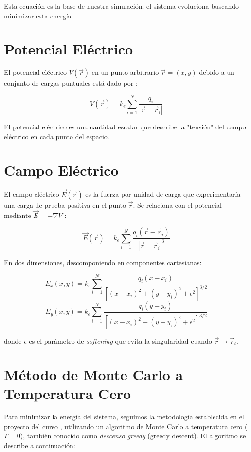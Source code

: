 Esta ecuación es la base de nuestra simulación: el sistema evoluciona buscando minimizar esta energía.

\section{Potencial Eléctrico}
El potencial eléctrico \(V(\vec{r})\) en un punto arbitrario \(\vec{r} = (x, y)\) debido a un conjunto de cargas puntuales está dado por \cite{potencial-molina2024}:

\begin{equation}
    V(\vec{r}) = k_e \sum_{i=1}^N \frac{q_i}{|\vec{r} - \vec{r}_i|}
    \label{eq:potencial}
\end{equation}

El potencial eléctrico es una cantidad escalar que describe la "tensión" del campo eléctrico en cada punto del espacio.

\section{Campo Eléctrico}
El campo eléctrico \(\vec{E}(\vec{r})\) es la fuerza por unidad de carga que experimentaría una carga de prueba positiva en el punto \(\vec{r}\). Se relaciona con el potencial mediante \(\vec{E} = -\nabla V\) \cite{campo-molina2024}:

\begin{equation}
    \vec{E}(\vec{r}) = k_e \sum_{i=1}^N \frac{q_i (\vec{r} - \vec{r}_i)}{|\vec{r} - \vec{r}_i|^3}
    \label{eq:campo_electrico}
\end{equation}

En dos dimensiones, descomponiendo en componentes cartesianas:

\begin{equation}
    E_x(x, y) = k_e \sum_{i=1}^N \frac{q_i (x - x_i)}{\left[(x - x_i)^2 + (y - y_i)^2 + \epsilon^2\right]^{3/2}}
\end{equation}
\begin{equation}
    E_y(x, y) = k_e \sum_{i=1}^N \frac{q_i (y - y_i)}{\left[(x - x_i)^2 + (y - y_i)^2 + \epsilon^2\right]^{3/2}}
\end{equation}

donde \(\epsilon\) es el parámetro de \textit{softening} que evita la singularidad cuando \(\vec{r} \to \vec{r}_i\).

\section{Método de Monte Carlo a Temperatura Cero}
Para minimizar la energía del sistema, seguimos la metodología establecida en el proyecto del curso \cite{proyecto-molina2024}, utilizando un algoritmo de Monte Carlo a temperatura cero (\(T = 0\)), también conocido como \textit{descenso greedy} (greedy descent). El algoritmo se describe a continuación:

